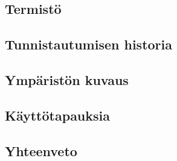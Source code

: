 
\subsection{Termistö}

\subsection{Tunnistautumisen historia}

\subsection{Ympäristön kuvaus}

\subsection{Käyttötapauksia}

\subsection{Yhteenveto}

